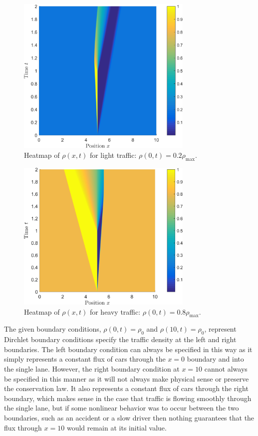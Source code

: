 \documentclass[11pt]{article}
\begin{document}
\begin{figure}[h!]
  \centering
  \includegraphics[width=0.75\textwidth]{1b_light_surf.png}
  \caption{Heatmap of $\rho(x,t)$ for light traffic: $\rho(0,t) = 0.2\rho_\mathrm{max}$.}
  \label{fig:1b_light_surf}
\end{figure}

\begin{figure}[h!]
  \centering
  \includegraphics[width=0.75\textwidth]{1b_heavy_surf.png}
  \caption{Heatmap of $\rho(x,t)$ for heavy traffic: $\rho(0,t) = 0.8\rho_\mathrm{max}$.}
  \label{fig:1b_heavy_surf}
\end{figure}

The given boundary conditions, $\rho(0, t) = \rho_0$ and $\rho(10, t) = \rho_0$, represent Dirchlet boundary conditions specify the traffic density at the left and right boundaries. The left boundary condition can always be specified in this way as it simply represents a constant flux of cars through the $x=0$ boundary and into the single lane. However, the right boundary condition at $x=10$ cannot always be specified in this manner as it will not always make physical sense or preserve the conservation law. It also represents a constant flux of cars through the right boundary, which makes sense in the case that traffic is flowing smoothly through the single lane, but if some nonlinear behavior was to occur between the two boundaries, such as an accident or a slow driver then nothing guarantees that the flux through $x=10$ would remain at its initial value.
\end{document}
